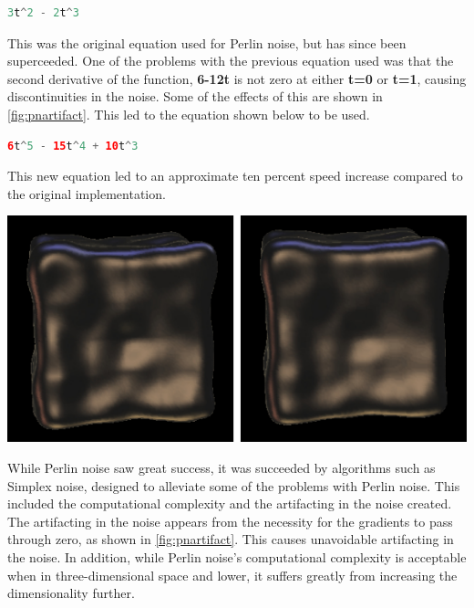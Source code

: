 \documentclass[10pt]{report}
\begin{document}
		\begin{lstlisting}[language=C]
			3t^2 - 2t^3
		\end{lstlisting}
		
		This was the original equation used for Perlin noise, but has since been superceeded. One of the problems with the previous equation used was that the second derivative of the function, \textbf{6-12t} is not zero at either \textbf{t=0} or \textbf{t=1}, causing discontinuities in the noise. Some of the effects of this are shown in \autoref{fig:pnartifact}. This led to the equation shown below to be used. 
		
		\begin{lstlisting}[language=Java]
			6t^5 - 15t^4 + 10t^3
		\end{lstlisting}
		
		This new equation led to an approximate ten percent speed increase compared to the original implementation. 
		
		\begin{minipage}{\textwidth}
			\centering
			\includegraphics[scale=.5]{s-curve}
			\label{fig:pnartifact}
		\end{minipage} 
		
		While Perlin noise saw great success, it was succeeded by algorithms such as Simplex noise, designed to alleviate some of the problems with Perlin noise. This included the computational complexity and the artifacting in the noise created. The artifacting in the noise appears from the necessity for the gradients to pass through zero, as shown in \autoref{fig:pnartifact}. This causes unavoidable artifacting in the noise. In addition, while Perlin noise's computational complexity is acceptable when in three-dimensional space and lower, it suffers greatly from increasing the dimensionality further.
		
\end{document}
